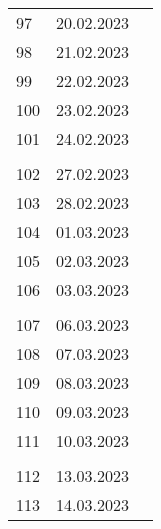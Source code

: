 \begin{longtable}{|l|c|l|}
&               &                                                       \\ \hline  
97  & 20.02.2023    &                                                       \\ \hline 
98  & 21.02.2023    &                                                       \\ \hline 
99  & 22.02.2023    &                                                       \\ \hline 
100 & 23.02.2023    &                                                       \\ \hline 
101 & 24.02.2023    &                                                       \\ \hline
&               &                                                       \\ \hline  
102 & 27.02.2023    &                                                       \\ \hline 
103 & 28.02.2023    &                                                       \\ \hline 
104 & 01.03.2023    &                                                       \\ \hline 
105 & 02.03.2023    &                                                       \\ \hline 
106 & 03.03.2023    &                                                       \\ \hline
&               &                                                       \\ \hline  
107 & 06.03.2023    &                                                       \\ \hline
108 & 07.03.2023    &                                                       \\ \hline
109 & 08.03.2023    &                                                       \\ \hline
110 & 09.03.2023    &                                                       \\ \hline
111 & 10.03.2023    &                                                       \\ \hline
&               &                                                       \\ \hline 
112 & 13.03.2023    &                                                       \\ \hline
113 & 14.03.2023    &                                                       \\ \hline

\end{longtable}
